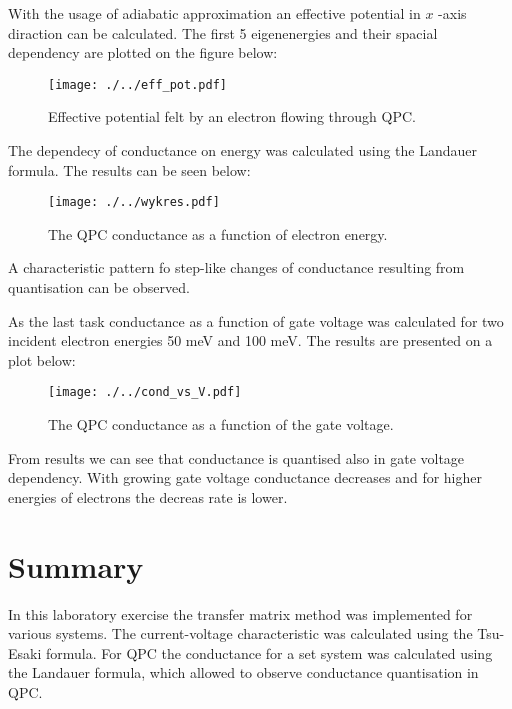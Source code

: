 \documentclass[a4paper,12pt]{article}
\begin{document}
	With the usage of adiabatic approximation an effective potential in $ x $ -axis diraction can be calculated. The first 5 eigenenergies and their spacial dependency  are plotted on the figure below:
	
	\begin{figure}[H]
		\centering
		\texttt{[image: ./../eff\_pot.pdf]}
		\caption{Effective potential felt by an electron flowing through QPC.}
	\end{figure}

	The dependecy of conductance on energy was calculated using the Landauer formula. The results can be seen below:
	
	\begin{figure}[H]
		\centering
		\texttt{[image: ./../wykres.pdf]}
		\caption{The QPC conductance as a function of electron energy.}
	\end{figure}

	A characteristic pattern fo step-like changes of conductance resulting from quantisation can be observed.
	
	As the last task conductance as a function of gate voltage was calculated for two incident electron energies 50 meV and 100 meV. The results are presented on a plot below:
	
	\begin{figure}[H]
		\centering
		\texttt{[image: ./../cond\_vs\_V.pdf]}
		\caption{The QPC conductance as a function of the gate voltage.}
	\end{figure}

	From results we can see that conductance is quantised also in gate voltage dependency. With growing gate voltage conductance decreases and for higher energies of electrons the decreas rate is lower.
	
	\section*{Summary}
	
	In this laboratory exercise the transfer matrix method was implemented for various systems. The current-voltage characteristic was calculated using the Tsu-Esaki formula. For QPC the conductance for a set system was calculated using the Landauer formula, which allowed to observe conductance quantisation in QPC.
	
	
\end{document}
